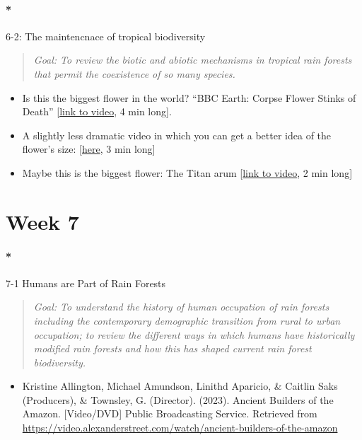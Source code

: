 \documentclass[
  10pt,
  letterpaper,
  oneside,
  open=any]{scrbook}
\let\oldparagraph\paragraph
\renewcommand{\paragraph}[1]{\oldparagraph{#1}\mbox{}}
\providecommand{\tightlist}{%
  \setlength{\itemsep}{0pt}\setlength{\parskip}{0pt}}\usepackage{longtable,booktabs,array}
\begin{document}
\paragraph*{6-2: The maintencnace of tropical
biodiversity}\label{the-maintencnace-of-tropical-biodiversity}

\begin{quote}
\emph{Goal: To review the biotic and abiotic mechanisms in tropical rain
forests that permit the coexistence of so many species.}
\end{quote}

\begin{itemize}
\item
  Is this the biggest flower in the world? ``BBC Earth: Corpse Flower
  Stinks of Death''
  {[}\href{https://www.youtube.com/watch?v=YxIpl38rsMo}{link to video},
  4 min long{]}.
\item
  A slightly less dramatic video in which you can get a better idea of
  the flower's size:
  {[}\href{https://www.youtube.com/watch?v=0cGRujABwuQ}{here}, 3 min
  long{]}
\item
  Maybe this is the biggest flower: The Titan arum
  {[}\href{https://www.youtube.com/watch?v=5Jg-GlCXpEI}{link to video},
  2 min long{]}
\end{itemize}

\section*{Week 7}\label{week-7}


\paragraph*{7-1 Humans are Part of Rain
Forests}\label{humans-are-part-of-rain-forests}

\begin{quote}
\emph{Goal: To understand the history of human occupation of rain
forests including the contemporary demographic transition from rural to
urban occupation; to review the different ways in which humans have
historically modified rain forests and how this has shaped current rain
forest biodiversity.}
\end{quote}

\begin{itemize}
\tightlist
\item
  Kristine Allington, Michael Amundson, Linithd Aparicio, \& Caitlin
  Saks (Producers), \& Townsley, G. (Director). (2023). Ancient Builders
  of the Amazon. {[}Video/DVD{]} Public Broadcasting Service. Retrieved
  from
  \url{https://video.alexanderstreet.com/watch/ancient-builders-of-the-amazon}
\end{itemize}
\end{document}
